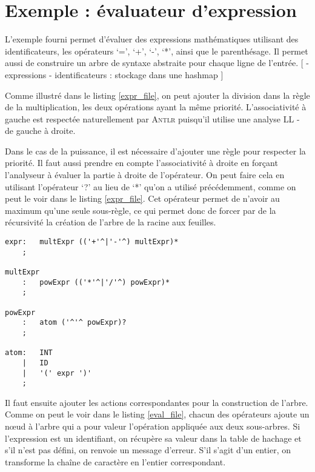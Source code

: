 \documentclass[paper=a4, fontsize=11pt]{scrartcl} %
\numberwithin{equation}{section} %
\numberwithin{figure}{section} %
\numberwithin{table}{section} %
\begin{document}


\section{Exemple : évaluateur d'expression}

L'exemple fourni permet d'évaluer des expressions mathématiques utilisant des 
identificateurs, les opérateurs `=', `+', `-', `*', ainsi que le parenthésage. 
Il permet aussi de construire un arbre de syntaxe abstraite pour chaque ligne 
de l'entrée.
[
- expressions
- identificateurs : stockage dans une hashmap
]


Comme illustré dans le listing \ref{expr_file}, on peut ajouter la division dans la règle de la multiplication, les deux opérations ayant la même priorité. L'associativité à gauche est respectée naturellement par \textsc{Antlr} puisqu'il utilise une analyse LL - de gauche à droite.

Dans le cas de la puissance, il est nécessaire d'ajouter une règle pour
respecter la priorité. Il faut aussi prendre en compte l'associativité à droite
en forçant l'analyseur à évaluer la partie à droite de l'opérateur. On peut
faire cela en utilisant l'opérateur `?' au lieu de `*' qu'on a utilisé
précédemment, comme on peut le voir dans le listing \ref{expr_file}. Cet
opérateur permet de n'avoir au maximum qu'une seule sous-règle, ce qui permet
donc de forcer par de la récursivité la création de l'arbre de la racine aux
feuilles.

    
\begin{lstlisting}[label=expr_file,caption=Fichier Expr.g,
linebackgroundcolor={\lstcolorlines[orange!30]{8,9,10}\lstcolorlines[blue!30]{5}}]
expr:   multExpr (('+'^|'-'^) multExpr)*
    ;

multExpr
    :   powExpr (('*'^|'/'^) powExpr)*
    ;

powExpr
    :   atom ('^'^ powExpr)?
    ;

atom:   INT
    |   ID
    |   '(' expr ')'
    ;
\end{lstlisting}

Il faut ensuite ajouter les actions correspondantes pour la construction de l'arbre. Comme on peut le voir dans le listing \ref{eval_file}, chacun des opérateurs ajoute un nœud à l'arbre qui a pour valeur l'opération appliquée aux deux sous-arbres. Si l'expression est un identifiant, on récupère sa valeur dans la table de hachage et s'il n'est pas défini, on renvoie un message d'erreur. S'il s'agit d'un entier, on transforme la chaîne de caractère en l'entier correspondant. 
\end{document}
